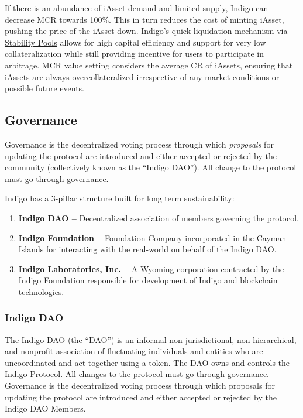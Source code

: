 \documentclass{article}
\begin{document}
\begin{sloppypar}
If there is an abundance of iAsset demand and limited supply, Indigo can
decrease MCR towards 100\%. This in turn reduces the cost of minting
iAsset, pushing the price of the iAsset down. Indigo's quick liquidation
mechanism via \protect\hyperlink{stability-pools}{Stability Pools}
allows for high capital efficiency and support for very low
collateralization while still providing incentive for users to
participate in arbitrage. MCR value setting considers the average CR of
iAssets, ensuring that iAssets are always overcollateralized
irrespective of any market conditions or possible future events.

\hypertarget{governance}{%
\subsection{Governance}\label{governance}}

Governance is the decentralized voting process through which
\emph{proposals} for updating the protocol are introduced and either
accepted or rejected by the community (collectively known as the
``Indigo DAO''). All change to the protocol must go through governance.

Indigo has a 3-pillar structure built for long term sustainability:

\begin{enumerate}
\item
  \textbf{Indigo DAO --} Decentralized association of members governing
  the protocol.
\item
  \textbf{Indigo Foundation --} Foundation Company incorporated in the
  Cayman Islands for interacting with the real-world on behalf of the
  Indigo DAO.
\item
  \textbf{Indigo Laboratories, Inc. --} A Wyoming corporation contracted
  by the Indigo Foundation responsible for development of Indigo and
  blockchain technologies.
\end{enumerate}

\hypertarget{indigo-dao}{%
\subsubsection{Indigo DAO}\label{indigo-dao}}

The Indigo DAO (the ``DAO'') is an informal non-jurisdictional,
non-hierarchical, and nonprofit association of fluctuating individuals
and entities who are uncoordinated and act together using a token. The
DAO owns and controls the Indigo Protocol. All changes to the protocol
must go through governance. Governance is the decentralized voting
process through which proposals for updating the protocol are introduced
and either accepted or rejected by the Indigo DAO Members.


\end{sloppypar}
\end{document}
